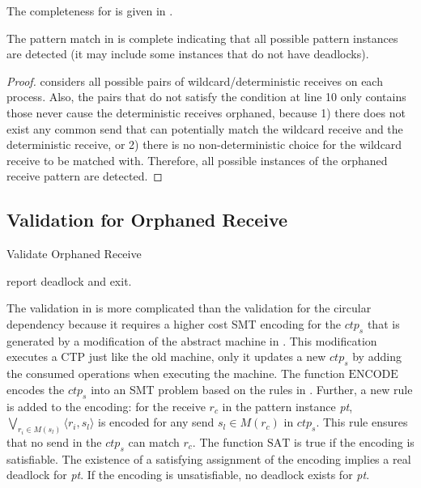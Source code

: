 The completeness for  is given in . 

\begin{lemma}
\label{lemma:pmorphaned}
The pattern match in  is complete indicating that all possible pattern instances are detected (it may include some instances that do not have deadlocks).
\end{lemma}
\begin{proof}
 considers all possible pairs of wildcard/deterministic receives on each process. Also, the pairs that do not satisfy the condition at line 10 only contains those never cause the deterministic receives orphaned, because 1) there does not exist any common send that can potentially match the wildcard receive and the deterministic receive, or 2) there is no non-deterministic choice for the wildcard receive to be matched with. 
Therefore, all possible instances of the orphaned receive pattern are detected. 
\end{proof}

\subsection{Validation for Orphaned Receive}

\begin{algorithm}
\caption{Validate Orphaned Receive}\label{algo:vorphaned}
\begin{algorithmic}[1]
\State report deadlock and exit.
\EndIf
\end{algorithmic}
\end{algorithm}

The validation in  is more complicated than the validation for the circular dependency because it requires a higher cost SMT encoding for the $\mathit{ctp_s}$ that is generated by a modification of the abstract machine in .
This modification executes a CTP just like the old machine, only it updates a new $\mathit{ctp_s}$ by adding the consumed operations when executing the machine.
The function $\mathrm{ENCODE}$ encodes the $\mathit{ctp_s}$ into an SMT problem based on the rules in \cite{DBLP:conf/kbse/HuangMM13}. Further, a new rule is added to the encoding: for the receive $\mathit{r_c}$ in the pattern instance \textit{pt}, $\bigvee_{\mathit{r_i}\in\mathit{M}(\mathit{s_l})}\langle\mathit{r_i},\mathit{s_l}\rangle$ is encoded for any send $\mathit{s_l}\in\mathit{M}(\mathit{r_c})$ in $\mathit{ctp_s}$. This rule ensures that no send in the $\mathit{ctp_s}$ can match $\mathit{r_c}$. The function $\mathrm{SAT}$ is true if the encoding is satisfiable. The existence of a satisfying assignment of the encoding implies a real deadlock for \textit{pt}. If the encoding is unsatisfiable, no deadlock exists for \textit{pt}.

